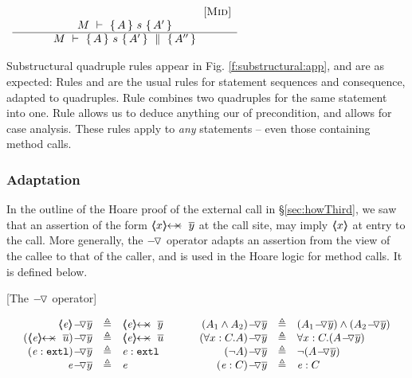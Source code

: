 \begin{center}
$
\begin{array}{c}
\begin{array}{c} \strut \ \ \ \ \ \ \ \ \ \ \ \ \ \ \ \ \ \ \ \ \ \ \ \ \ \ \ \ \ \ \ \ \ \ \ \ \ \ \ \ \ \ \ \ \ \ \ \ \ \ {{\mbox{[\sc{Mid}]}}} \\ M\ \vdash\ \{\,A\, \} \ s\  \{\,A'\, \}  \\ \hline M\ \vdash\ \{\,A\, \} \ s\  \{\,A'\, \}\, \,\parallel\,\, \{\, A'' \, \}  \end{array}
  \end{array}
 $
 \end{center}
 
Substructural quadruple rules appear in  Fig. \ref{f:substructural:app}, and are as expected: 
Rules   {} and {} are  the usual rules for statement sequences and consequence, adapted to quadruples.
Rule {} combines two quadruples for the same statement into one.
Rule  {} allows us to deduce anything our of  precondition, and  {} allows for case analysis.
These  rules  apply to \emph{any} statements -- even those containing method calls.

\subsubsection{Adaptation}

  \label{s:viewAndProtect}
 
In the outline of the Hoare proof of the external call in  \S  \ref{sec:howThird},  we saw that an assertion of the form $\protectedFrom x {\overline {y}}$ at the call site,  may imply $\langle\!\!\langle x \rangle\!\!\rangle$ at entry to the call.
More generally,  the $ {-\!\,\!{\triangledown}} {}$ operator  adapts an assertion from the view of the callee to that of the caller,
 and is used in the Hoare logic for method calls. It is defined below. 
 
 
\begin{definition}
\label{def:push}
[The $ {-\!\,\!{\triangledown}} {}$  operator]  

$
\begin{array}{c}
\begin{array}{l}
\begin{array}{rclcrcl}
  \PushAS y {\inside \re} & \triangleq &  \protectedFrom \re {\overline {y} }
  & \ \ \  \ &
  \PushAS y   {(A_1  \wedge  A_2)} & \triangleq &  (\PushAS y  { A_1})  \wedge  ( \PushAS y  {A_2} )  
\\ 
 \PushAS y {(\protectedFrom \re {\overline {u}})} &  \triangleq& \protectedFrom \re {\overline {u}} 
  & &
 \PushAS y  {(\forall x:C.A)} & \triangleq & \forall x:C.({\PushAS y A} )  
  \\  
  \PushAS y  {(\external \re)} &  \triangleq & {\external \re}  %
  & & 
  \PushAS y  {(\neg A)} &  \triangleq & \neg( {\PushAS y A} )  
    \\
     \PushAS y  {\re} &  \triangleq&   \re %
    & &
    \PushAS y  {(\re:C)} &  \triangleq&   \re:C 
 \end{array}
\end{array}
\end{array}
$
\label{f:Push}
\end{definition}
 

